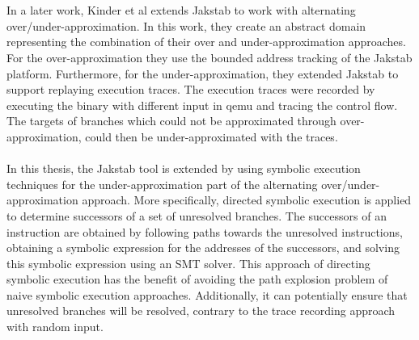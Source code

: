 \documentclass{kththesis}
\begin{document}
\\ \\
In a later work, Kinder et al extends Jakstab to work with alternating over/under-approximation\cite{alternating}. In this work, they create an abstract domain representing the combination of their over and under-approximation approaches. For the over-approximation they use the bounded address tracking of the Jakstab platform. Furthermore, for the under-approximation, they extended Jakstab to support replaying execution traces. The execution traces were recorded by executing the binary with different input in qemu and tracing the control flow. The targets of branches which could not be approximated through over-approximation, could then be under-approximated with the traces. 
\\ \\
In this thesis, the Jakstab tool is extended by using symbolic execution techniques for the under-approximation part of the alternating over/under-approximation approach. More specifically, directed symbolic execution is applied to determine successors of a set of unresolved branches. The successors of an instruction are obtained by following paths towards the unresolved instructions, obtaining a symbolic expression for the addresses of the successors, and solving this symbolic expression using an SMT solver. This approach of directing symbolic execution has the benefit of avoiding the path explosion problem of naive symbolic execution approaches. Additionally, it can potentially ensure that unresolved branches will be resolved, contrary to the trace recording approach with random input.
\end{document}
